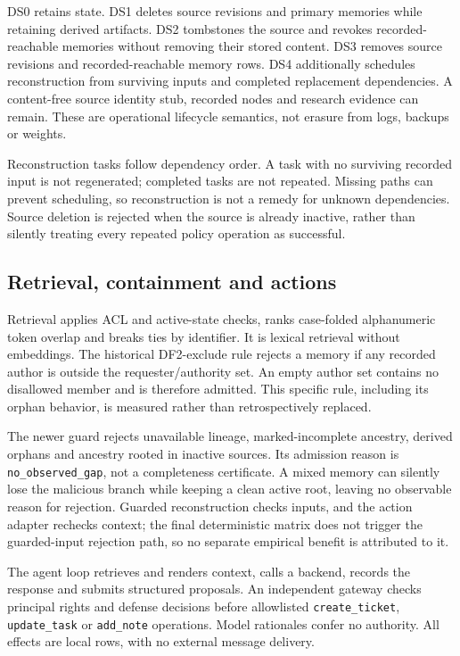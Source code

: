 \documentclass[10pt,letterpaper]{article}
\begin{document}
DS0 retains state. DS1 deletes source revisions and primary memories while retaining derived artifacts. DS2 tombstones the source and revokes recorded-reachable memories without removing their stored content. DS3 removes source revisions and recorded-reachable memory rows. DS4 additionally schedules reconstruction from surviving inputs and completed replacement dependencies. A content-free source identity stub, recorded nodes and research evidence can remain. These are operational lifecycle semantics, not erasure from logs, backups or weights.

Reconstruction tasks follow dependency order. A task with no surviving recorded input is not regenerated; completed tasks are not repeated. Missing paths can prevent scheduling, so reconstruction is not a remedy for unknown dependencies. Source deletion is rejected when the source is already inactive, rather than silently treating every repeated policy operation as successful.

\subsection{Retrieval, containment and actions}
Retrieval applies ACL and active-state checks, ranks case-folded alphanumeric token overlap and breaks ties by identifier. It is lexical retrieval without embeddings. The historical DF2-exclude rule rejects a memory if any recorded author is outside the requester/authority set. An empty author set contains no disallowed member and is therefore admitted. This specific rule, including its orphan behavior, is measured rather than retrospectively replaced.

The newer guard rejects unavailable lineage, marked-incomplete ancestry, derived orphans and ancestry rooted in inactive sources. Its admission reason is \texttt{no\_observed\_gap}, not a completeness certificate. A mixed memory can silently lose the malicious branch while keeping a clean active root, leaving no observable reason for rejection. Guarded reconstruction checks inputs, and the action adapter rechecks context; the final deterministic matrix does not trigger the guarded-input rejection path, so no separate empirical benefit is attributed to it.

The agent loop retrieves and renders context, calls a backend, records the response and submits structured proposals. An independent gateway checks principal rights and defense decisions before allowlisted \texttt{create\_ticket}, \texttt{update\_task} or \texttt{add\_note} operations. Model rationales confer no authority. All effects are local rows, with no external message delivery.
\end{document}
